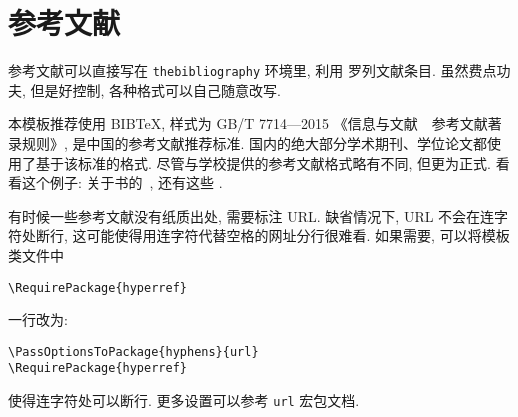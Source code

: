 \chapter{参考文献}
\label{cha:bib}
参考文献可以直接写在 \texttt{thebibliography} 环境里, 利用  罗列文献条目.
虽然费点功夫, 但是好控制, 各种格式可以自己随意改写.

本模板推荐使用 BIB\TeX, 样式为 GB/T 7714—2015 《信息与文献 参考文献著录规则》, 是中国的参考文献推荐标准.
国内的绝大部分学术期刊、学位论文都使用了基于该标准的格式.
尽管与学校提供的参考文献格式略有不同, 但更为正式.
看看这个例子: 关于书的~\cite{tex1989,algebra2000}, 还有这些 \cite{narasimhan_language_2015,
drl_2018,nikiforov2014,BuFanZhou2016:Z-eigenvalues,HuQiShao2013:Cored-Hypergraphs,
KangNikiforov2014:Extremal-Problems,LinZhou2016:Distance-Spectral,
LuMan2016:Small-Spectral-Radius,Nikiforov2017:Symmetric-Spectrum,Qi2014:H-Plus-Eigenvalues}.

有时候一些参考文献没有纸质出处, 需要标注 URL.
缺省情况下, URL 不会在连字符处断行, 这可能使得用连字符代替空格的网址分行很难看.
如果需要, 可以将模板类文件中
\begin{verbatim}
\RequirePackage{hyperref}
\end{verbatim}
一行改为:
\begin{verbatim}
\PassOptionsToPackage{hyphens}{url}
\RequirePackage{hyperref}
\end{verbatim}
使得连字符处可以断行. 更多设置可以参考 \texttt{url} 宏包文档.